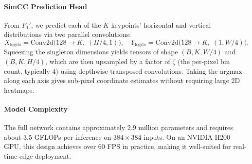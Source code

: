 \paragraph{SimCC Prediction Head}
From $F_1'$, we predict each of the $K$ keypoints’ horizontal and vertical distributions via two parallel convolutions:
\[
  X_{\text{logits}} = \mathrm{Conv2d}\bigl(128\!\to\!K,\;(H/4,1)\bigr),\quad
  Y_{\text{logits}} = \mathrm{Conv2d}\bigl(128\!\to\!K,\;(1,W/4)\bigr).
\]
Squeezing the singleton dimensions yields tensors of shape $(B,K,W/4)$ and $(B,K,H/4)$, which are then upsampled by a factor of $\zeta$ (the per‐pixel bin count, typically $4$) using depthwise transposed convolutions.  Taking the argmax along each axis gives sub‐pixel coordinate estimates without requiring large 2D heatmaps.

\paragraph{Model Complexity}
The full network contains approximately $2.9$ million parameters and requires about $3.5$ GFLOPs per inference on $384\times384$ inputs.  On an NVIDIA H200 GPU, this design achieves over 60 FPS in practice, making it well‐suited for real‐time edge deployment.  
